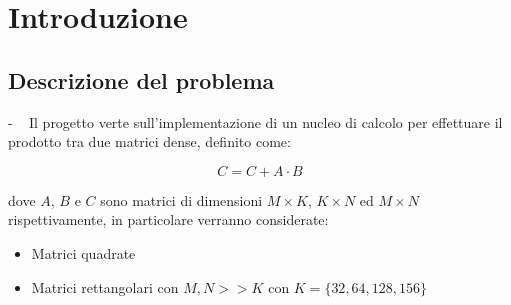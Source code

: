 \documentclass[compress]{beamer}
\begin{document}
\begin{frame}[plain]
    \titlepage
\end{frame}

\section{Introduzione}

\subsection{Descrizione del problema}
\begin{frame}{\secname \text{ }- \subsecname\ }
    Il progetto verte sull'implementazione di un nucleo di calcolo per effettuare il prodotto tra due matrici dense, definito come:
    \begin{Definition}
        \begin{equation}
            \label{eq:ce_ue}
            C = C + A\cdot B
        \end{equation}
    \end{Definition}
    dove $A$, $B$ e $C$ sono matrici di dimensioni $M\times K$, $K\times N$ ed $M\times N$ rispettivamente, in particolare verranno considerate:
    \begin{itemize}
        \item Matrici quadrate
        \item Matrici rettangolari con $M,N>>K$ con $K=\{32, 64, 128, 156\}$
    \end{itemize}
\end{frame}
\end{document}
